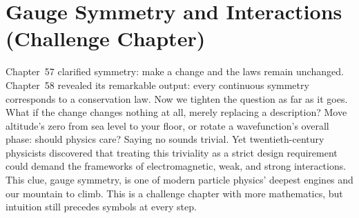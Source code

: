 \chapter[Gauge Symmetry and Interactions]{Gauge Symmetry and Interactions (Challenge Chapter)}

Chapter~57 clarified symmetry: make a change and the laws remain unchanged. Chapter~58 revealed its remarkable output: every continuous symmetry corresponds to a conservation law. Now we tighten the question as far as it goes. What if the change changes nothing at all, merely replacing a description? Move altitude's zero from sea level to your floor, or rotate a wavefunction's overall phase: should physics care? Saying no sounds trivial. Yet twentieth-century physicists discovered that treating this triviality as a strict design requirement could demand the frameworks of electromagnetic, weak, and strong interactions. This clue, gauge symmetry, is one of modern particle physics' deepest engines and our mountain to climb. This is a challenge chapter with more mathematics, but intuition still precedes symbols at every step.


